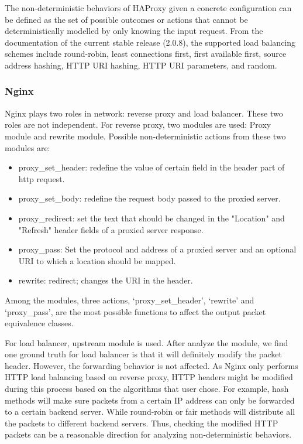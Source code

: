 The non-deterministic behaviors of HAProxy given a concrete configuration can be
defined as the set of possible outcomes or actions that cannot be
deterministically modelled by only knowing the input request. From the
documentation of the current stable release (2.0.8), the supported load
balancing schemes include round-robin, least connections first, first available
first, source address hashing, HTTP URI hashing, HTTP URI parameters, and
random.

\subsubsection{Nginx}

Nginx plays two roles in network: reverse proxy and load balancer. These two
roles are not independent. For reverse proxy, two modules are used: \ca Proxy
module and \cb rewrite module. Possible non-deterministic actions from these two
modules are:
\begin{itemize}
    \item proxy\_set\_header: redefine the value of certain field in the header
        part of http request.
    \item proxy\_set\_body: redefine the request body passed to the proxied
        server.
    \item proxy\_redirect: set the text that should be changed in the "Location"
        and "Refresh" header fields of a proxied server response.
    \item proxy\_pass: Set the protocol and address of a proxied server and an
        optional URI to which a location should be mapped.
	\item rewrite: redirect; changes the URI in the header.
\end{itemize}
Among the modules, three actions, `proxy\_set\_header', `rewrite' and
`proxy\_pass', are the most possible functions to affect the output packet
equivalence classes.

For load balancer, upstream module is used. After analyze the module, we find
one ground truth for load balancer is that it will definitely modify the packet
header. However, the forwarding behavior is not affected. As Nginx only performs
HTTP load balancing based on reverse proxy, HTTP headers might be modified
during this process based on the algorithms that user chose. For example, hash
methods will make sure packets from a certain IP address can only be forwarded
to a certain backend server. While round-robin or fair methods will distribute
all the packets to different backend servers. Thus, checking the modified HTTP
packets can be a reasonable direction for analyzing non-deterministic behaviors.

